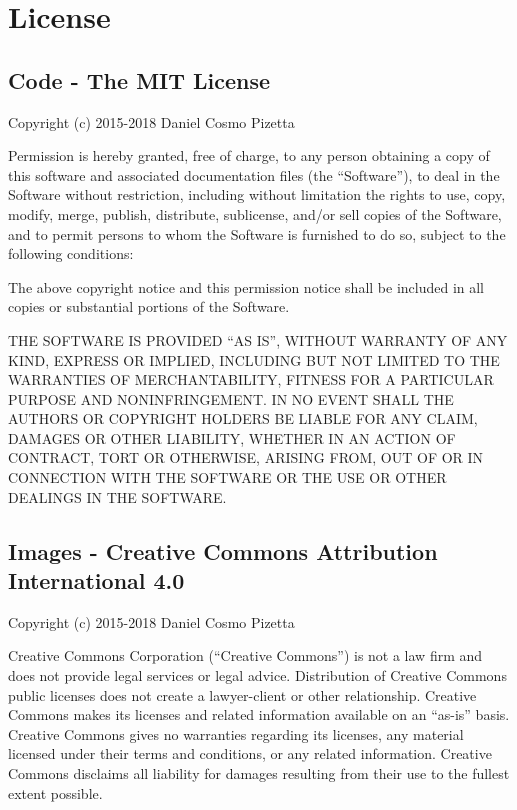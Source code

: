 \documentclass[a4paper,10pt,english]{sphinxmanual}
\begin{document}
\chapter{License}
\label{\detokenize{license:license}}\label{\detokenize{license::doc}}

\section{Code - The MIT License}
\label{\detokenize{license:code-the-mit-license}}
Copyright (c) 2015-2018 Daniel Cosmo Pizetta

Permission is hereby granted, free of charge, to any person obtaining a copy
of this software and associated documentation files (the “Software”), to deal
in the Software without restriction, including without limitation the rights
to use, copy, modify, merge, publish, distribute, sublicense, and/or sell
copies of the Software, and to permit persons to whom the Software is
furnished to do so, subject to the following conditions:

The above copyright notice and this permission notice shall be included in
all copies or substantial portions of the Software.

THE SOFTWARE IS PROVIDED “AS IS”, WITHOUT WARRANTY OF ANY KIND, EXPRESS OR
IMPLIED, INCLUDING BUT NOT LIMITED TO THE WARRANTIES OF MERCHANTABILITY,
FITNESS FOR A PARTICULAR PURPOSE AND NONINFRINGEMENT. IN NO EVENT SHALL THE
AUTHORS OR COPYRIGHT HOLDERS BE LIABLE FOR ANY CLAIM, DAMAGES OR OTHER
LIABILITY, WHETHER IN AN ACTION OF CONTRACT, TORT OR OTHERWISE, ARISING FROM,
OUT OF OR IN CONNECTION WITH THE SOFTWARE OR THE USE OR OTHER DEALINGS IN
THE SOFTWARE.


\section{Images - Creative Commons Attribution International 4.0}
\label{\detokenize{license:images-creative-commons-attribution-international-4-0}}
Copyright (c) 2015-2018 Daniel Cosmo Pizetta

Creative Commons Corporation (“Creative Commons”) is not a law firm and does not provide legal services or legal advice. Distribution of Creative Commons public licenses does not create a lawyer-client or other relationship. Creative Commons makes its licenses and related information available on an “as-is” basis. Creative Commons gives no warranties regarding its licenses, any material licensed under their terms and conditions, or any related information. Creative Commons disclaims all liability for damages resulting from their use to the fullest extent possible.
\end{document}
